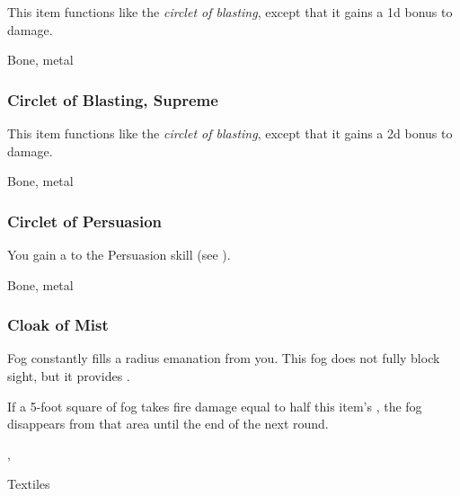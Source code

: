 This item functions like the \textit{circlet of blasting}, except that it gains a \plus1d bonus to damage.



 


 Bone, metal


\lowercase{\hypertarget{item:Circlet of Blasting, Supreme}{}}\label{item:Circlet of Blasting, Supreme}
\hypertarget{item:Circlet of Blasting, Supreme}{\subsubsection{Circlet of Blasting, Supreme\hfill{}}}

This item functions like the \textit{circlet of blasting}, except that it gains a \plus2d bonus to damage.



 


 Bone, metal


\lowercase{\hypertarget{item:Circlet of Persuasion}{}}\label{item:Circlet of Persuasion}
\hypertarget{item:Circlet of Persuasion}{\subsubsection{Circlet of Persuasion\hfill{}}}

You gain a   to the Persuasion skill (see ).



 Bone, metal


\lowercase{\hypertarget{item:Cloak of Mist}{}}\label{item:Cloak of Mist}
\hypertarget{item:Cloak of Mist}{\subsubsection{Cloak of Mist\hfill{}}}

Fog constantly fills a \areamed radius emanation from you.
This fog does not fully block sight, but it provides \concealment.

If a 5-foot square of fog takes fire damage equal to half this item's , the fog disappears from that area until the end of the next round.



 , 


 Textiles


